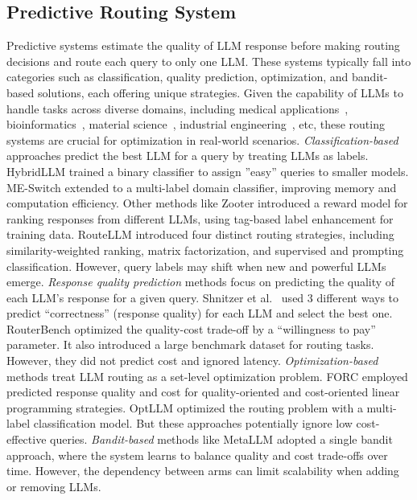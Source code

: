 \subsection{Predictive Routing System}
Predictive systems estimate the quality of LLM response before making routing decisions and route each query to only one LLM. These systems typically fall into categories such as classification, quality prediction, optimization, and bandit-based solutions, each offering unique strategies. Given the capability of LLMs to handle tasks across diverse domains, including medical applications~\cite{liu2024calorie,liu2025calorie}, bioinformatics~\cite{ying2024revolutionizing,liu2024pth}, material science~\cite{hu2024reinforcement}, industrial engineering~\cite{xie2025transformer,xie2024spatio}, etc, these routing systems are crucial for optimization in real-world scenarios.
\textit{Classification-based} approaches predict the best LLM for a query by treating LLMs as labels.
HybridLLM \cite{ding2024hybrid} trained a binary classifier to assign ''easy'' queries to smaller models. ME-Switch \cite{liu2024me} extended to a multi-label domain classifier, improving memory and computation efficiency. Other methods like Zooter \cite{lu-etal-2024-routing} introduced a reward model for ranking responses from different LLMs, using tag-based label enhancement for training data. RouteLLM \cite{ong2024routellm} introduced four distinct routing strategies, including similarity-weighted ranking, matrix factorization, and supervised and prompting classification. However, query labels may shift when new and powerful LLMs emerge.
\textit{Response quality prediction} methods focus on predicting the quality of each LLM's response for a given query.
Shnitzer et al.~\cite{shnitzer2023large} used 3 different ways to predict ``correctness'' (response quality) for each LLM and select the best one. RouterBench \cite{hu2024routerbench} optimized the quality-cost trade-off by a ``willingness to pay'' parameter. It also introduced a large benchmark dataset for routing tasks. However, they did not predict cost and ignored latency. 
\textit{Optimization-based} methods treat LLM routing as a set-level optimization problem. 
FORC \cite{vsakota2024fly} employed predicted response quality and cost for quality-oriented and cost-oriented linear programming strategies.
OptLLM \cite{liu2024optllm} optimized the routing problem with a multi-label classification model.
But these approaches potentially ignore low cost-effective queries.
\textit{Bandit-based} methods like MetaLLM \cite{nguyen2024metallm} adopted a single bandit approach, where the system learns to balance quality and cost trade-offs over time. However, the dependency between arms can limit scalability when adding or removing LLMs.

 

